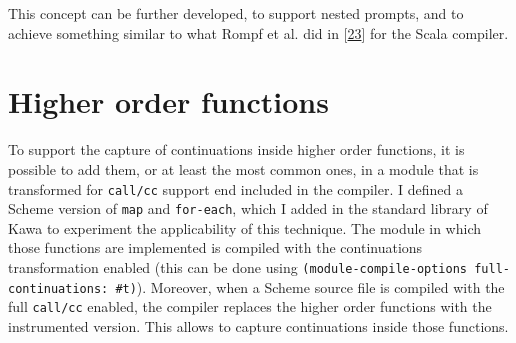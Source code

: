 \documentclass[12pt,a4paper,oneside,openright]{book}
\newenvironment{Shaded}{\begin{snugshade}}{\end{snugshade}}
\newcommand{\KeywordTok}[1]{\textcolor[rgb]{0.13,0.29,0.53}{\textbf{{#1}}}}
\newcommand{\FunctionTok}[1]{\textcolor[rgb]{0.00,0.00,0.00}{{#1}}}
\newcommand{\NormalTok}[1]{{#1}}
\begin{document}
\begin{Shaded}
\end{Shaded}

This concept can be further developed, to support nested prompts, and to
achieve something similar to what Rompf et al. did in
{[}\hyperref[ref-Rompf2009]{23}{]} for the Scala compiler.

\section{Higher order functions}\label{higher-order-functions}

To support the capture of continuations inside higher order functions,
it is possible to add them, or at least the most common ones, in a
module that is transformed for \texttt{call/cc} support end included in
the compiler. I defined a Scheme version of \texttt{map} and
\texttt{for-each}, which I added in the standard library of Kawa to
experiment the applicability of this technique. The module in which
those functions are implemented is compiled with the continuations
transformation enabled (this can be done using
\texttt{(module-compile-options\ full-continuations:\ \#t)}). Moreover,
when a Scheme source file is compiled with the full \texttt{call/cc}
enabled, the compiler replaces the higher order functions with the
instrumented version. This allows to capture continuations inside those
functions.
\end{document}
